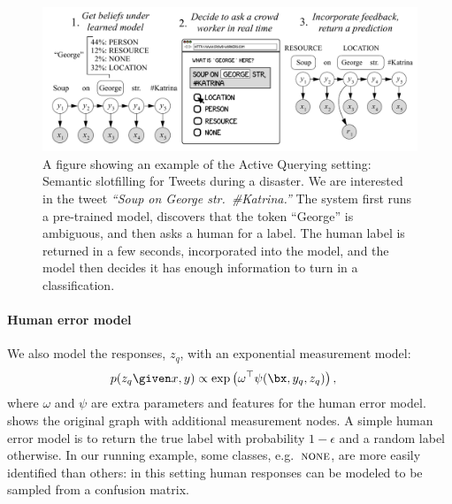 \begin{figure}[t]
  \begin{centering}
  \includegraphics[width=1.0\textwidth]{figures/intro-banner.pdf}
  \end{centering}
  \caption{A figure showing an example of the Active Querying setting: Semantic slotfilling for Tweets during a disaster. We are interested in the tweet \textit{``Soup on George str.\ \#Katrina.''} The system first runs a pre-trained model, discovers that the token ``George'' is ambiguous, and then asks a human for a label. The human label is returned in a few seconds, incorporated into the model, and the model then decides it has enough information to turn in a classification.}
\label{fig:crf}
\end{figure}


\paragraph{Human error model}
We also model the responses, $z_q$, with an exponential measurement model:
\begin{align*}
  p(z_q \given x, y) 
  &\propto \exp \left( \omega^\top\psi(\bx, y_q, z_q) \right),
\end{align*}
where $\omega$ and $\psi$ are extra parameters and features for the human error model. 
 shows the original graph with additional measurement nodes.
A simple human error model is to return the true label with probability $1-\epsilon$ and a random label otherwise.
In our running example, some classes, e.g.\ $\textsc{none}$, are more easily identified than others: in this setting human responses can be modeled to be sampled from a confusion matrix.

